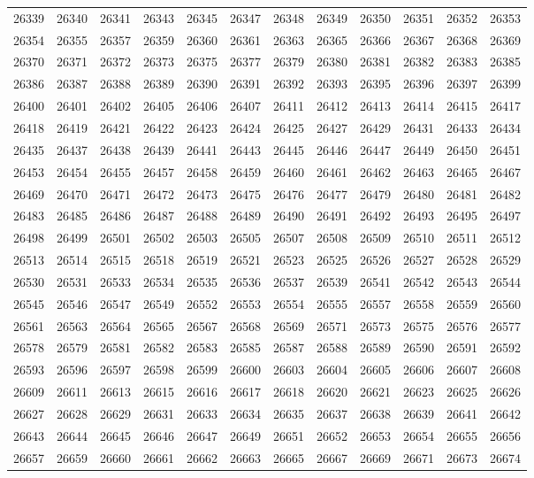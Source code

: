 \begin{center}
\begin{longtable}{llllllllllll}
26339 &26340 &26341 &26343 &26345 &26347 &26348 &26349 &26350 &26351 &26352 &26353 \\
26354 &26355 &26357 &26359 &26360 &26361 &26363 &26365 &26366 &26367 &26368 &26369 \\
26370 &26371 &26372 &26373 &26375 &26377 &26379 &26380 &26381 &26382 &26383 &26385 \\
26386 &26387 &26388 &26389 &26390 &26391 &26392 &26393 &26395 &26396 &26397 &26399 \\
26400 &26401 &26402 &26405 &26406 &26407 &26411 &26412 &26413 &26414 &26415 &26417 \\
26418 &26419 &26421 &26422 &26423 &26424 &26425 &26427 &26429 &26431 &26433 &26434 \\
26435 &26437 &26438 &26439 &26441 &26443 &26445 &26446 &26447 &26449 &26450 &26451 \\
26453 &26454 &26455 &26457 &26458 &26459 &26460 &26461 &26462 &26463 &26465 &26467 \\
26469 &26470 &26471 &26472 &26473 &26475 &26476 &26477 &26479 &26480 &26481 &26482 \\
26483 &26485 &26486 &26487 &26488 &26489 &26490 &26491 &26492 &26493 &26495 &26497 \\
26498 &26499 &26501 &26502 &26503 &26505 &26507 &26508 &26509 &26510 &26511 &26512 \\
26513 &26514 &26515 &26518 &26519 &26521 &26523 &26525 &26526 &26527 &26528 &26529 \\
26530 &26531 &26533 &26534 &26535 &26536 &26537 &26539 &26541 &26542 &26543 &26544 \\
26545 &26546 &26547 &26549 &26552 &26553 &26554 &26555 &26557 &26558 &26559 &26560 \\
26561 &26563 &26564 &26565 &26567 &26568 &26569 &26571 &26573 &26575 &26576 &26577 \\
26578 &26579 &26581 &26582 &26583 &26585 &26587 &26588 &26589 &26590 &26591 &26592 \\
26593 &26596 &26597 &26598 &26599 &26600 &26603 &26604 &26605 &26606 &26607 &26608 \\
26609 &26611 &26613 &26615 &26616 &26617 &26618 &26620 &26621 &26623 &26625 &26626 \\
26627 &26628 &26629 &26631 &26633 &26634 &26635 &26637 &26638 &26639 &26641 &26642 \\
26643 &26644 &26645 &26646 &26647 &26649 &26651 &26652 &26653 &26654 &26655 &26656 \\
26657 &26659 &26660 &26661 &26662 &26663 &26665 &26667 &26669 &26671 &26673 &26674 \\

\end{longtable}
\end{center}
